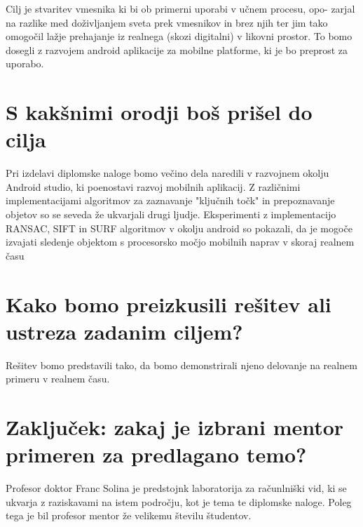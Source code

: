\documentclass[11pt,a4paper]{article}
\begin{document}
Cilj je stvaritev vmesnika ki bi ob primerni uporabi v učnem procesu, opo-
zarjal na razlike med doživljanjem sveta prek vmesnikov in brez njih ter jim
tako omogočil lažje prehajanje iz realnega (skozi digitalni) v likovni prostor.
To bomo dosegli z razvojem android aplikacije za mobilne platforme, ki je bo preprost za uporabo.


\section{S kakšnimi orodji boš prišel do cilja}

Pri izdelavi diplomske naloge bomo večino dela naredili v razvojnem okolju
Android studio, ki poenostavi razvoj mobilnih aplikacij. Z različnimi implementacijami algoritmov za zaznavanje "ključnih točk" in prepoznavanje objetov so se seveda že ukvarjali drugi ljudje. Eksperimenti z implementacijo  RANSAC, SIFT in SURF algoritmov v okolju android so pokazali, da je mogoče izvajati sledenje objektom s procesorsko močjo mobilnih naprav v skoraj realnem času \cite{olsson2009distributed}


\section{Kako bomo preizkusili rešitev ali ustreza zadanim ciljem?}

Rešitev bomo predstavili tako, da bomo demonstrirali njeno delovanje na
realnem primeru v realnem času.


\section{Zaključek: zakaj je izbrani mentor primeren za predlagano temo?}

Profesor doktor Franc Solina je predstojnk laboratorija za računlniški vid, ki se ukvarja z raziskavami na istem področju, kot je tema te diplomske naloge. Poleg tega je bil profesor mentor že velikemu številu študentov.



\end{document}
